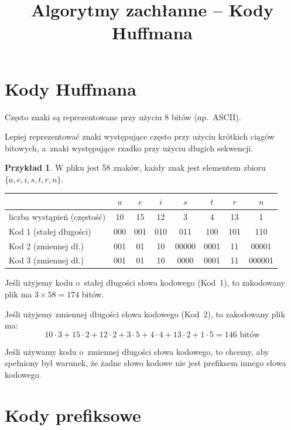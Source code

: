 \documentclass[a4paper,11pt]{article}
\title{Algorytmy zachłanne -- Kody Huffmana}
\author{}
\date{}
\theoremstyle{definition}
\newtheorem{example}{Przykład}
\begin{document}
\maketitle

\section{Kody Huffmana}

Często znaki są reprezentowane przy użyciu 8 bitów (np.\ ASCII).

Lepiej reprezentować znaki występujące często przy użyciu krótkich ciągów bitowych, a~znaki występujące rzadko przy użyciu długich sekwencji.

\begin{example}
W pliku jest 58 znaków, każdy znak jest elementem zbioru $\{a, e, i, s, t, r, n\}$.

\begin{center}
\begin{tabular}{|l|c|c|c|c|c|c|c|}
\hline
 & $a$ & $e$ & $i$ & $s$ & $t$ & $r$ & $n$ \\
\hline
liczba wystąpień (częstość) & 10 & 15 & 12 & 3 & 4 & 13 & 1 \\
\hline
Kod 1 (stałej długości) & 000 & 001 & 010 & 011 & 100 & 101 & 110 \\
\hline
Kod 2 (zmiennej dł.) & 001 & 01 & 10 & 00000 & 0001 & 11 & 00001 \\
\hline
Kod 3 (zmiennej dł.) & 001 & 01 & 10 & 0000 & 0001 & 11 & 000001 \\
\hline
\end{tabular}
\end{center}

Jeśli użyjemy kodu o~stałej długości słowa kodowego (Kod~1), to zakodowany plik ma $3 \times 58 = 174$ bitów.

Jeśli użyjemy zmiennej długości słowa kodowego (Kod~2), to zakodowany plik ma:
\[
    10 \cdot 3 + 15 \cdot 2 + 12 \cdot 2 + 3 \cdot 5 + 4 \cdot 4 + 13 \cdot 2 + 1 \cdot 5 = 146 \text{ bitów}
\]

Jeśli używamy kodu o~zmiennej długości słowa kodowego, to chcemy, aby spełniony był warunek, że żadne słowo kodowe nie jest prefiksem innego słowa kodowego.
\end{example}

\section{Kody prefiksowe}
\end{document}
